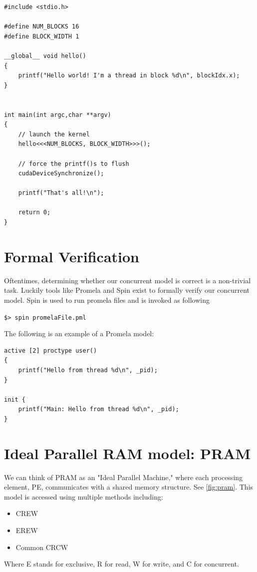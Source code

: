 \documentclass[twoside]{article}
\begin{document}
\begin{lstlisting}
#include <stdio.h>

#define NUM_BLOCKS 16
#define BLOCK_WIDTH 1

__global__ void hello()
{
    printf("Hello world! I'm a thread in block %d\n", blockIdx.x);
}


int main(int argc,char **argv)
{
    // launch the kernel
    hello<<<NUM_BLOCKS, BLOCK_WIDTH>>>();

    // force the printf()s to flush
    cudaDeviceSynchronize();

    printf("That's all!\n");

    return 0;
}
\end{lstlisting}

\section{Formal Verification}
Oftentimes, determining whether our concurrent model is correct is a non-trivial task. Luckily tools like Promela and Spin exist to formally verify our concurrent model. Spin is used to run promela files and is invoked as following 

\texttt{\$> spin promelaFile.pml}

The following is an example of a Promela model:
\begin{lstlisting}
active [2] proctype user()
{
    printf("Hello from thread %d\n", _pid);
}

init {
    printf("Main: Hello from thread %d\n", _pid);
}
\end{lstlisting}

\section{Ideal Parallel RAM model: PRAM}
We can think of PRAM as an "Ideal Parallel Machine," where each processing element, PE, communicates with a shared memory structure. See \ref{fig:pram}. This model is accessed using multiple methods including:

\begin{itemize}
  \item CREW
  \item EREW
  \item Common CRCW
\end{itemize}

Where E stands for exclusive, R for read, W for write, and C for concurrent.
\end{document}
